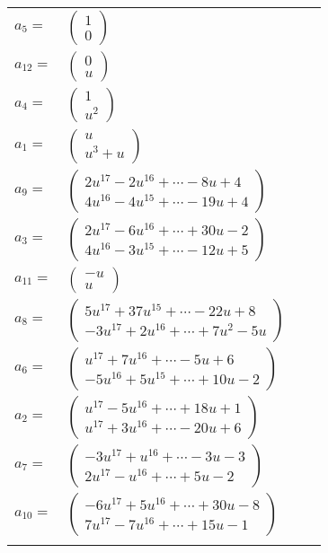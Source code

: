 \documentclass[1p]{elsarticle_modified}
\theoremstyle{definition}
\begin{document}
\begin{tabular}{m{7pt} m{180pt} m{7pt} m{180pt} }
\flushright $a_{5}=$&$\begin{pmatrix}1\\0\end{pmatrix}$ \\
\flushright $a_{12}=$&$\begin{pmatrix}0\\u\end{pmatrix}$ \\
\flushright $a_{4}=$&$\begin{pmatrix}1\\u^2\end{pmatrix}$ \\
\flushright $a_{1}=$&$\begin{pmatrix}u\\u^3+u\end{pmatrix}$ \\
\flushright $a_{9}=$&$\begin{pmatrix}2 u^{17}-2 u^{16}+\cdots-8 u+4\\4 u^{16}-4 u^{15}+\cdots-19 u+4\end{pmatrix}$ \\
\flushright $a_{3}=$&$\begin{pmatrix}2 u^{17}-6 u^{16}+\cdots+30 u-2\\4 u^{16}-3 u^{15}+\cdots-12 u+5\end{pmatrix}$ \\
\flushright $a_{11}=$&$\begin{pmatrix}- u\\u\end{pmatrix}$ \\
\flushright $a_{8}=$&$\begin{pmatrix}5 u^{17}+37 u^{15}+\cdots-22 u+8\\-3 u^{17}+2 u^{16}+\cdots+7 u^2-5 u\end{pmatrix}$ \\
\flushright $a_{6}=$&$\begin{pmatrix}u^{17}+7 u^{16}+\cdots-5 u+6\\-5 u^{16}+5 u^{15}+\cdots+10 u-2\end{pmatrix}$ \\
\flushright $a_{2}=$&$\begin{pmatrix}u^{17}-5 u^{16}+\cdots+18 u+1\\u^{17}+3 u^{16}+\cdots-20 u+6\end{pmatrix}$ \\
\flushright $a_{7}=$&$\begin{pmatrix}-3 u^{17}+u^{16}+\cdots-3 u-3\\2 u^{17}- u^{16}+\cdots+5 u-2\end{pmatrix}$ \\
\flushright $a_{10}=$&$\begin{pmatrix}-6 u^{17}+5 u^{16}+\cdots+30 u-8\\7 u^{17}-7 u^{16}+\cdots+15 u-1\end{pmatrix}$\\&\end{tabular}
\end{document}
